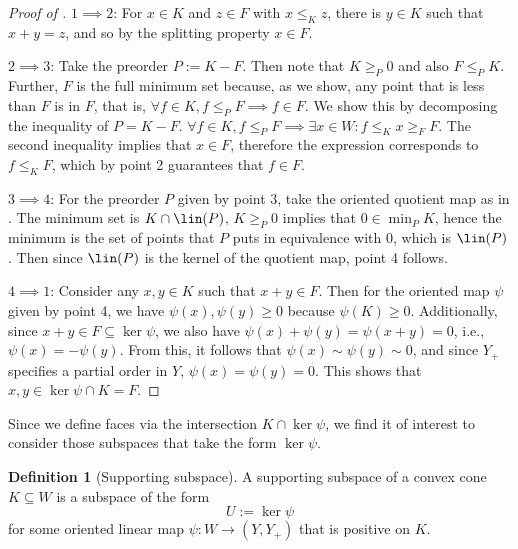 \documentclass{article}
\theoremstyle{plain}
\theoremstyle{definition}
\newtheorem{definition}[definition]{Definition}
\theoremstyle{remark}
\begin{document}
\begin{proof}[\hypertarget{loc:characterization_of_the_faces_of_convex_cones.proof}{}Proof of ]

$1 \implies 2$: For $x \in K$ and $z \in F$ with $x \le_{K} z$, there is $y \in K$ such that $x + y = z$, and so
by the splitting property $x \in F$.

$2  \implies 3$: Take the preorder $P := K - F$. Then note that $K \ge_{P} 0$ and also $F \leq_{P} K$. Further, $F$ is the full minimum set because, as we show, any point that is less than $F$ is in $F$, that is, $\forall f  \in K, f \leq_{P} F  \implies f  \in F$. We show this by decomposing the inequality of $P=K-F$.
$\forall f \in K, f \leq_{P} F  \implies \exists x  \in W: f \leq_{K} x \geq_{F} F$. The second inequality implies that $x \in F$,
therefore the expression corresponds to $f \leq_{K} F$, which by point 2 guarantees that $f  \in F$.

$3 \implies 4$: For the preorder $P$ given by point 3, take the oriented quotient map as in . The minimum set is $K \cap \lin(P)$, $K \ge_{P} 0$ implies that
$0 \in \min_P K$, hence the minimum is the set of points that $P$ puts in equivalence with $0$, which is $\lin(P)$. Then since $\lin(P)$ is the kernel of the quotient map, point 4 follows.

$4 \implies 1$: Consider any $x, y \in K$ such that $x + y \in F$.
Then for the oriented map $\psi$ given by point 4, we have
$\psi(x),  \psi(y) \ge 0$ because $\psi(K) \ge 0$.
Additionally, since $x + y \in F \subseteq \ker \psi$,
we also have $\psi(x) + \psi(y) =  \psi(x + y) = 0$,
i.e., $\psi(x)= -\psi(y)$. From this,
it follows that $\psi(x) \sim \psi(y) \sim 0$,
and since $Y_+$ specifies a partial order in $Y$,
$\psi(x)= \psi(y)= 0$.
This shows that $x, y \in \ker \psi \cap K = F$.
\end{proof}
Since we define faces via the intersection $K \cap \ker \psi$, we find
it of interest to consider those subspaces that take the form $\ker \psi$.
\begin{definition}[Supporting subspace]
\label{loc:supporting_subspace_definition_from_oriented_maps.statement}
A supporting subspace of a convex cone $K \subseteq W$ is a subspace of the form
\begin{equation*}
U := \ker \psi
\end{equation*}
for some oriented linear map $\psi:W \to (Y, Y_+)$ that is positive on $K$.
\end{definition}
\end{document}

